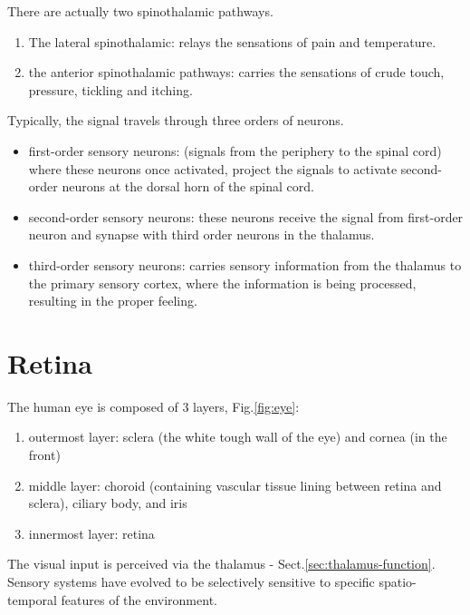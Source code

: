 There are actually two spinothalamic pathways.
\begin{enumerate}
  \item The lateral spinothalamic: relays the
sensations of pain and temperature. 
  
  \item the anterior spinothalamic pathways: carries the
sensations of crude touch, pressure, tickling and
itching.
  
\end{enumerate}

Typically, the signal travels through three orders of neurons.
\begin{itemize}
  \item first-order sensory neurons: (signals from the periphery to the spinal
  cord) where these neurons once activated, project the signals to activate
  second-order neurons at the dorsal horn of the spinal cord.
  
  \item second-order sensory neurons: these neurons receive the
  signal from first-order neuron and synapse with third order neurons
  in the thalamus. 
  
  
  
  \item third-order sensory neurons: carries sensory information from
the thalamus to the primary sensory cortex, where the information is
being processed, resulting in the proper feeling.
\end{itemize}



\chapter{Retina}
\label{chap:Retina}

The human eye is composed of 3 layers, Fig.\ref{fig:eye}:
\begin{enumerate}

  \item outermost layer: sclera (the white tough wall of the eye) and cornea
  (in the front)

  \item middle layer: choroid (containing vascular tissue lining between retina
  and sclera), ciliary body, and iris

  \item innermost layer: retina
\end{enumerate}

The visual input is perceived via the thalamus -
Sect.\ref{sec:thalamus-function}.
Sensory systems have evolved to be selectively sensitive to specific
spatio-temporal features of the environment. 

